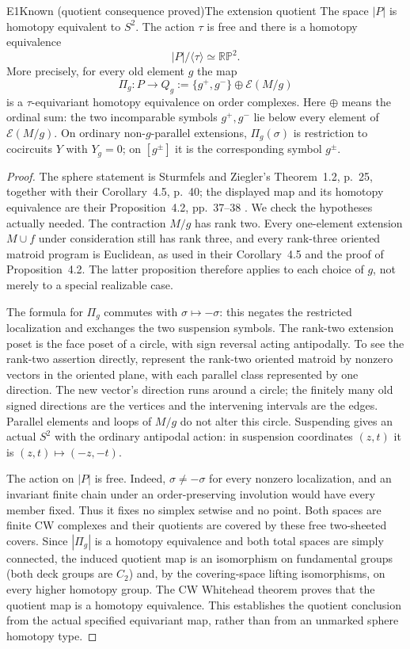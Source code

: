 \begin{resultenv}{E1}{Known (quotient consequence proved)}{The extension quotient}
The space $|P|$ is homotopy equivalent to $S^2$. The action $\tau$ is free and
there is a homotopy equivalence
\[
 |P|/\langle\tau\rangle\simeq\mathbb {RP}^{2}.
\]
More precisely, for every old element $g$ the map
\[
 \Pi_g:P\longrightarrow Q_g:=\{g^+,g^-\}\oplus\mathcal E(M/g)
\]
is a $\tau$-equivariant homotopy equivalence on order complexes. Here $\oplus$
means the ordinal sum: the two incomparable symbols $g^+,g^-$ lie below every
element of $\mathcal E(M/g)$. On ordinary non-$g$-parallel extensions,
$\Pi_g(\sigma)$ is restriction to cocircuits $Y$ with $Y_g=0$; on $[g^\pm]$
it is the corresponding symbol $g^\pm$.
\end{resultenv}
\begin{proof}
The sphere statement is Sturmfels and Ziegler's Theorem~1.2, p.~25, together
with their Corollary~4.5, p.~40; the displayed map and its homotopy equivalence
are their Proposition~4.2, pp.~37--38 \cite{SturmfelsZiegler1993}. We check the
hypotheses actually needed. The contraction $M/g$ has rank two. Every
one-element extension $M\cup f$ under consideration still has rank three,
and every rank-three oriented matroid program is Euclidean, as used in their
Corollary~4.5 and the proof of Proposition~4.2. The latter proposition therefore
applies to each choice of $g$, not merely to a special realizable case.

The formula for $\Pi_g$ commutes with $\sigma\mapsto-\sigma$: this negates the
restricted localization and exchanges the two suspension symbols. The
rank-two extension poset is the face poset of a circle, with sign reversal
acting antipodally. To see the rank-two assertion directly, represent the
rank-two oriented matroid by nonzero vectors in the oriented plane, with each
parallel class represented by one direction. The new vector's direction runs
around a circle; the finitely many old signed directions are the vertices
and the intervening intervals are the edges. Parallel elements and loops of
$M/g$ do not alter this circle. Suspending gives an actual $S^2$ with the
ordinary antipodal action: in suspension coordinates $(z,t)$ it is
$(z,t)\mapsto(-z,-t)$.

The action on $|P|$ is free. Indeed, $\sigma\neq-\sigma$ for every nonzero
localization, and an invariant finite chain under an order-preserving
involution would have every member fixed. Thus it fixes no simplex setwise
and no point. Both spaces are finite CW complexes and their quotients are
covered by these free two-sheeted covers. Since $|\Pi_g|$ is a homotopy
equivalence and both total spaces are simply connected, the induced quotient
map is an isomorphism on fundamental groups (both deck groups are $C_2$) and,
by the covering-space lifting isomorphisms, on every higher homotopy group.
The CW Whitehead theorem proves that the quotient map is a homotopy
equivalence. This establishes the quotient conclusion from the actual
specified equivariant map, rather than from an unmarked sphere homotopy type.
\end{proof}

